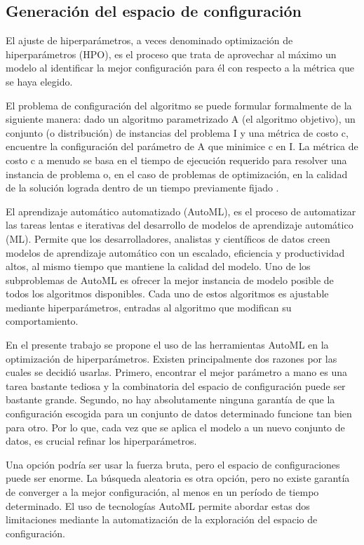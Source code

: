 \subsection{Generación del espacio de configuración}

El ajuste de hiperparámetros, a veces denominado optimización de hiperparámetros (HPO), es el proceso que trata de aprovechar al máximo un modelo al identificar la mejor configuración para él con respecto a la métrica que se haya elegido. 

El problema de configuración del algoritmo se puede formular formalmente de la siguiente manera: dado un algoritmo parametrizado A (el algoritmo objetivo), un conjunto (o distribución) de instancias del problema I y una métrica de costo c, encuentre la configuración del parámetro de A que minimice c en I. La métrica de costo c a menudo se basa en el tiempo de ejecución requerido para resolver una instancia de problema o, en el caso de problemas de optimización, en la calidad de la solución lograda dentro de un tiempo previamente fijado \cite{hutter2011sequential}.

El aprendizaje automático automatizado (AutoML), es el proceso de automatizar las tareas lentas e iterativas del desarrollo de modelos de aprendizaje automático (ML). Permite que los desarrolladores, analistas y científicos de datos creen modelos de aprendizaje automático con un escalado, eficiencia y productividad altos, al mismo tiempo que mantiene la calidad del modelo. Uno de los subproblemas de AutoML es ofrecer la mejor instancia de modelo posible de todos los algoritmos disponibles. Cada uno de estos algoritmos es ajustable mediante hiperparámetros, entradas al algoritmo que modifican su comportamiento. 

En el presente trabajo se propone el uso de las herramientas AutoML en la optimización de hiperparámetros. Existen principalmente dos razones por las cuales se decidió usarlas. Primero, encontrar el mejor parámetro a mano es una tarea bastante tediosa y la combinatoria del espacio de configuración puede ser bastante grande. Segundo, no hay absolutamente ninguna garantía de que la configuración escogida para un conjunto de datos determinado funcione tan bien para otro. Por lo que, cada vez que se aplica el modelo a un nuevo conjunto de datos, es crucial refinar los hiperparámetros. 

Una opción podría ser usar la fuerza bruta, pero el espacio de configuraciones puede ser enorme. La búsqueda aleatoria es otra opción, pero no existe garantía de converger a la mejor configuración, al menos en un período de tiempo determinado. El uso de tecnologías AutoML permite abordar estas dos limitaciones mediante la automatización de la exploración del espacio de configuración.

